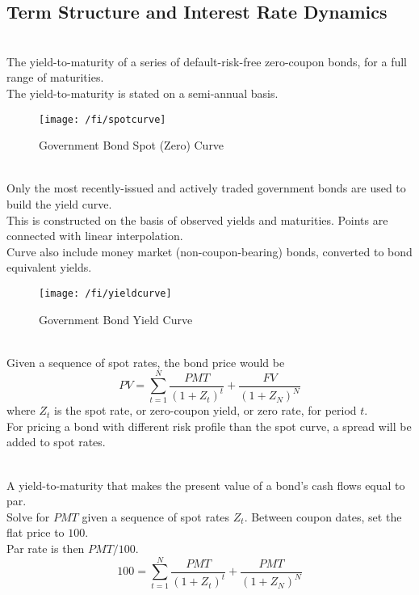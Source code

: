 \subsection{Term Structure and Interest Rate Dynamics}

\begin{definition} \\
The yield-to-maturity of a series of default-risk-free zero-coupon bonds, for a full range of maturities.\\
The yield-to-maturity is stated on a semi-annual basis.
\end{definition}

\begin{figure}[H]
\centering
\texttt{[image: /fi/spotcurve]}
\caption{Government Bond Spot (Zero) Curve}
\end{figure}

\begin{definition} \\
Only the most recently-issued and actively traded government bonds are used to build the yield curve.\\
This is constructed on the basis of observed yields and maturities. Points are connected with linear interpolation.\\
Curve also include money market (non-coupon-bearing) bonds, converted to bond equivalent yields.
\end{definition}

\begin{figure}[H]
\centering
\texttt{[image: /fi/yieldcurve]}
\caption{Government Bond Yield Curve}
\end{figure}

\begin{method} \\
Given a sequence of spot rates, the bond price would be
\begin{equation}
PV = \sum\limits_{t=1}^N \frac{PMT}{(1+Z_t)^t} + \frac{FV}{(1+Z_N)^N} \nonumber
\end{equation}
where $Z_t$ is the spot rate, or zero-coupon yield, or zero rate, for period $t$.\\
For pricing a bond with different risk profile than the spot curve, a spread will be added to spot rates.
\end{method}

\begin{method} \\
A yield-to-maturity that makes the present value of a bond’s cash flows equal to par.\\
Solve for $PMT$ given a sequence of spot rates $Z_t$. Between coupon dates, set the flat price to $100$.\\
Par rate is then $PMT/100$.
\begin{equation}
100 = \sum\limits_{t=1}^N \frac{PMT}{(1+Z_t)^t} + \frac{PMT}{(1+Z_N)^N} \nonumber
\end{equation}
\end{method}

